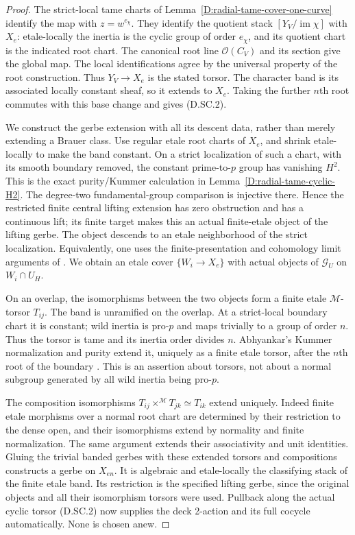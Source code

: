 \begin{proof}
The strict-local tame charts of
Lemma~\ref{D:radial-tame-cover-one-curve} identify the
map with $z=w^{e_\chi}$. They identify the quotient
stack $[Y_V/\operatorname{im}\chi]$ with $X_e$:
etale-locally the inertia is the cyclic group of order
$e_\chi$, and its quotient chart is the indicated root
chart. The canonical root line $\mathcal O(C_V)$ and
its section give the global map. The local identifications
agree by the universal property of the root construction.
Thus $Y_V\to X_e$ is the stated torsor. The character
band is its associated locally constant sheaf, so it
extends to $X_e$. Taking the further $n$th root commutes
with this base change and gives (D.SC.2).

We construct the gerbe extension with all its descent
data, rather than merely extending a Brauer class.
Use regular etale root charts of $X_e$, and shrink
etale-locally to make the band constant. On a strict
localization of such a chart, with its smooth boundary
removed, the constant prime-to-$p$ group has vanishing
$H^2$. This is the exact purity/Kummer calculation in
Lemma~\ref{D:radial-tame-cyclic-H2}. The degree-two
fundamental-group comparison is injective there.
Hence the restricted finite central lifting extension
has zero obstruction and has a continuous lift; its
finite target makes this an actual finite-etale object
of the lifting gerbe. The object descends to an etale
neighborhood of the strict localization. Equivalently,
one uses the finite-presentation and cohomology limit
arguments of \citet[Lemma59.51.2 and Theorem59.51.3,
complete written proofs]{StacksCoherentRootSectorsB}.
We obtain an etale cover $\{W_i\to X_e\}$ with actual
objects of $\mathscr G_U$ on $W_i\cap U_H$.

On an overlap, the isomorphisms between the two objects
form a finite etale $\mathcal M$-torsor $T_{ij}$.
The band is unramified on the overlap. At a strict-local
boundary chart it is constant; wild inertia is pro-$p$
and maps trivially to a group of order $n$. Thus the
torsor is tame and its inertia order divides $n$.
Abhyankar's Kummer normalization and purity extend it,
uniquely as a finite etale torsor, after the $n$th root
of the boundary
\citep[full Lemma58.31.5, Tag0EYG]{StacksRadialTameGeometryB}.
This is an assertion about torsors, not about a normal
subgroup generated by all wild inertia being pro-$p$.

The composition isomorphisms
$T_{ij}\mathbin{\times}^{\mathcal M}T_{jk}\simeq T_{ik}$
extend uniquely. Indeed finite etale morphisms over a
normal root chart are determined by their restriction
to the dense open, and their isomorphisms extend by
normality and finite normalization. The same argument
extends their associativity and unit identities.
Gluing the trivial banded gerbes with these extended
torsors and compositions constructs a gerbe on $X_{en}$.
It is algebraic and etale-locally the classifying stack
of the finite etale band. Its restriction is the specified
lifting gerbe, since the original objects and all their
isomorphism torsors were used. Pullback along the actual
cyclic torsor (D.SC.2) now supplies the deck 2-action
and its full cocycle automatically. None is chosen anew.
\end{proof}

